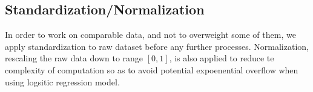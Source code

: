 \documentclass[10pt,conference,compsocconf]{IEEEtran}
\begin{document}


\subsection{Standardization/Normalization}
In order to work on comparable data, and not to overweight some of them, we apply standardization to raw dataset before any further processes. Normalization, rescaling the raw data down to range $[0, 1]$, is also applied to reduce te complexity of computation so as to avoid potential expoenential overflow when using logsitic regression model.
\end{document}
